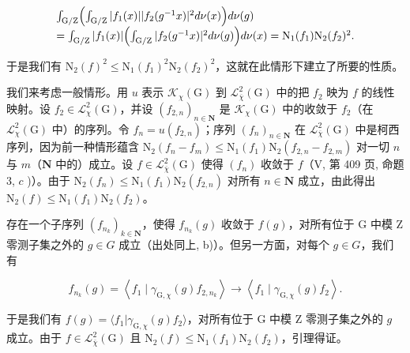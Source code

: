 \[
\begin{array}{l} \int_ {\mathrm{G} / \mathrm{Z}} \Bigl (\int_ {\mathrm{G} / \mathrm{Z}} | f _ {1} (x) |   | f _ {2} (g ^ {- 1} x) | ^ {2} d \nu (x) \Bigr) d \nu (g) \\ = \int_ {\mathrm{G} / \mathrm{Z}} | f _ {1} (x) | \Bigl (\int_ {\mathrm{G} / \mathrm{Z}} | f _ {2} (g ^ {- 1} x) | ^ {2} d \nu (g) \Bigr) d \nu (x) = \mathrm{N} _ {1} (f _ {1}) \mathrm{N} _ {2} (f _ {2}) ^ {2}. \end{array}
\]

于是我们有 \(\mathrm{N}_{2}(f)^{2}\leqslant\mathrm{N}_{1}(f_{1})^{2}\mathrm{N}_{2}(f_{2})^{2}\)，这就在此情形下建立了所要的性质。

 我们来考虑一般情形。用 \(u\) 表示 \(\mathcal{K}_{\chi}(\mathrm{G})\) 到 \(\mathcal{L}_{\overline{\chi}}^{2}(\mathrm{G})\) 中的把 \(f_{2}\) 映为 \(f\) 的线性映射。设 \(f_{2} \in \mathcal{L}_{\chi}^{2}(\mathrm{G})\)，并设 \((f_{2,n})_{n \in \mathbf{N}}\) 是 \(\mathcal{K}_{\chi}(\mathrm{G})\) 中的收敛于 \(f_{2}\)（在 \(\mathcal{L}_{\chi}^{2}(\mathrm{G})\) 中）的序列。令 \(f_{n} = u(f_{2,n})\)；序列 \((f_{n})_{n \in \mathbf{N}}\) 在 \(\mathcal{L}_{\overline{\chi}}^{2}(\mathrm{G})\) 中是柯西序列，因为前一种情形蕴含 \(\mathrm{N}_{2}(f_{n} - f_{m}) \leqslant \mathrm{N}_{1}(f_{1})\mathrm{N}_{2}(f_{2,n} - f_{2,m})\) 对一切 \(n\) 与 \(m\)（\(\mathbf{N}\) 中的）成立。设 \(f \in \mathcal{L}_{\overline{\chi}}^{2}(\mathrm{G})\) 使得 \((f_{n})\) 收敛于 \(f\)（V, 第 409 页, 命题 3, \(c\) )）。由于 \(\mathrm{N}_{2}(f_{n}) \leqslant \mathrm{N}_{1}(f_{1})\mathrm{N}_{2}(f_{2,n})\) 对所有 \(n \in \mathbf{N}\) 成立，由此得出 \(\mathrm{N}_{2}(f) \leqslant \mathrm{N}_{1}(f_{1})\mathrm{N}_{2}(f_{2})\)。

存在一个子序列 \((f_{n_{k}})_{k\in\mathbf{N}}\)，使得 \(f_{n_{k}}(g)\) 收敛于 \(f(g)\)，对所有位于 G 中模 Z 零测子集之外的 \(g\in G\) 成立（出处同上, b)）。但另一方面，对每个 \(g\in G\)，我们有

\[
f _ {n _ {k}} (g) = \left\langle f _ {1} \mid \gamma_ {\mathrm{G}, \chi} (g) f _ {2, n _ {k}} \right\rangle\rightarrow \left\langle f _ {1} \mid \gamma_ {\mathrm{G}, \chi} (g) f _ {2} \right\rangle .
\]

于是我们有 \(f(g) = \langle f_1 | \gamma_{\mathrm{G},\chi}(g)f_2 \rangle\)，对所有位于 G 中模 Z 零测子集之外的 \(g\) 成立。由于 \(f \in \mathcal{L}_{\overline{\chi}}^2(\mathrm{G})\) 且 \(\mathrm{N}_2(f) \leqslant \mathrm{N}_1(f_1)\mathrm{N}_2(f_2)\)，引理得证。


